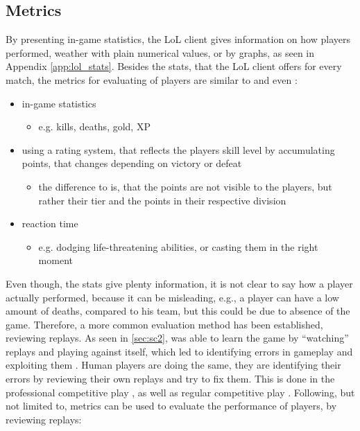 \subsection{Metrics}
By presenting in-game statistics, the LoL client gives information on how players performed, weather with plain numerical values, or by graphs, as seen in Appendix \ref{app:lol_stats}. Besides the stats, that the LoL client offers for every match, the metrics for evaluating of players are similar to  and even :
\begin{itemize}
	\item in-game statistics
	\begin{itemize}
		\item e.g. kills, deaths, gold, XP
	\end{itemize}
	\item{using a rating system, that reflects the players skill level by accumulating points, that changes depending on victory or defeat}
	\begin{itemize}
		\item the difference to  is, that the points are not visible to the players, but rather their tier and the points in their respective division
	\end{itemize}
	\item{reaction time}
	\begin{itemize}
		\item e.g. dodging life-threatening abilities, or casting them in the right moment
	\end{itemize}
\end{itemize}
Even though, the stats give plenty information, it is not clear to say how a player actually performed, because it can be misleading, e.g., a player can have a low amount of deaths, compared to his team, but this could be due to absence of the game. Therefore, a more common evaluation method has been established, reviewing replays. As seen in \ref{sec:sc2},  was able to learn the game by ``watching'' replays and playing against itself, which led to identifying errors in gameplay and exploiting them \cite{Vinyals2019}. Human players are doing the same, they are identifying their errors by reviewing their own replays and try to fix them. This is done in the professional competitive play \cite{TheStory90:online}, as well as regular competitive play \cite{Challeng53:online}. Following, but not limited to, metrics can be used to evaluate the performance of players, by reviewing replays:
